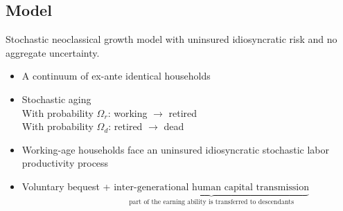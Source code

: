 \documentclass{article}
\begin{document}
\begin{spacing}{1.5}
\section{Model}
\setlength{\parindent}{2em}
\noindent
Stochastic neoclassical growth model with uninsured idiosyncratic risk and no aggregate uncertainty.
\begin{itemize}
\item A continuum of ex-ante identical households
\item Stochastic aging\\
With probability $\Omega_r$: working $\rightarrow$ retired\\
With probability $\Omega_d$: retired $\rightarrow$ dead
\item Working-age households face an uninsured idiosyncratic stochastic labor productivity process
\item Voluntary bequest + $\underbrace{\text{inter-generational human capital transmission}}_{\text{part of the earning ability is transferred to descendants}}$\\
\end{itemize}


\end{spacing}
\end{document}
